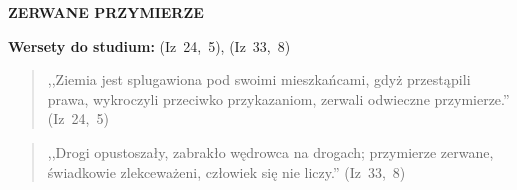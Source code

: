 \documentclass[10pt,a4paper,oneside]{article}
\begin{document}
\centerline{\textbf{\MakeUppercase{Zerwane przymierze}}}
\begin{center}
\textbf{Wersety do studium:} \mbox{(Iz 24, 5)}, \mbox{(Iz 33, 8)}
\end{center}
\begin{quote}
,,Ziemia jest splugawiona pod swoimi mieszkańcami, gdyż przestąpili prawa, wykroczyli przeciwko przykazaniom, zerwali odwieczne przymierze.'' \mbox{(Iz 24, 5)}
\end{quote}
\begin{quote}
,,Drogi opustoszały, zabrakło wędrowca na drogach; przymierze zerwane, świadkowie zlekceważeni, człowiek się nie liczy.'' \mbox{(Iz 33, 8)}
\end{quote}
\end{document}
